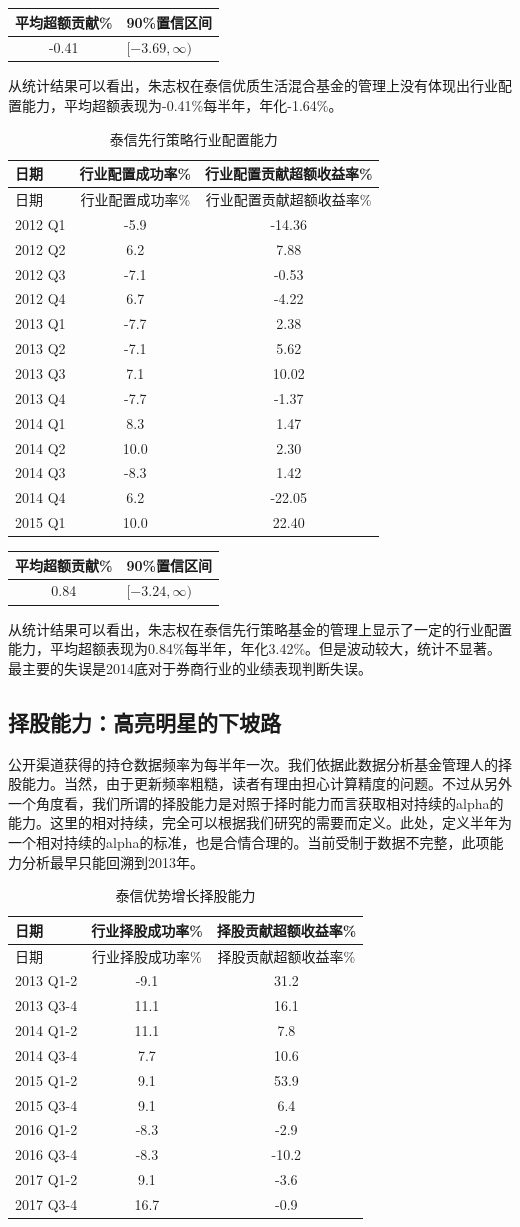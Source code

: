 \documentclass[hyperref,]{ctexart}
\begin{document}
\begin{longtable}[]{@{}cl@{}}
\toprule
平均超额贡献\% & 90\%置信区间\tabularnewline
\midrule
\endhead
-0.41 & \([-3.69,\infty)\)\tabularnewline
\bottomrule
\end{longtable}

从统计结果可以看出，朱志权在泰信优质生活混合基金的管理上没有体现出行业配置能力，平均超额表现为-0.41\%每半年，年化-1.64\%。

\begin{longtable}[]{@{}lcc@{}}
\caption{泰信先行策略行业配置能力}\tabularnewline
\toprule
日期 & 行业配置成功率\% & 行业配置贡献超额收益率\%\tabularnewline
\midrule
\endfirsthead
\toprule
日期 & 行业配置成功率\% & 行业配置贡献超额收益率\%\tabularnewline
\midrule
\endhead
2012 Q1 & -5.9 & -14.36\tabularnewline
2012 Q2 & 6.2 & 7.88\tabularnewline
2012 Q3 & -7.1 & -0.53\tabularnewline
2012 Q4 & 6.7 & -4.22\tabularnewline
2013 Q1 & -7.7 & 2.38\tabularnewline
2013 Q2 & -7.1 & 5.62\tabularnewline
2013 Q3 & 7.1 & 10.02\tabularnewline
2013 Q4 & -7.7 & -1.37\tabularnewline
2014 Q1 & 8.3 & 1.47\tabularnewline
2014 Q2 & 10.0 & 2.30\tabularnewline
2014 Q3 & -8.3 & 1.42\tabularnewline
2014 Q4 & 6.2 & -22.05\tabularnewline
2015 Q1 & 10.0 & 22.40\tabularnewline
\bottomrule
\end{longtable}

\begin{longtable}[]{@{}cl@{}}
\toprule
平均超额贡献\% & 90\%置信区间\tabularnewline
\midrule
\endhead
0.84 & \([-3.24,\infty)\)\tabularnewline
\bottomrule
\end{longtable}

从统计结果可以看出，朱志权在泰信先行策略基金的管理上显示了一定的行业配置能力，平均超额表现为0.84\%每半年，年化3.42\%。但是波动较大，统计不显著。最主要的失误是2014底对于券商行业的业绩表现判断失误。

\subsection{择股能力：高亮明星的下坡路}

公开渠道获得的持仓数据频率为每半年一次。我们依据此数据分析基金管理人的择股能力。当然，由于更新频率粗糙，读者有理由担心计算精度的问题。不过从另外一个角度看，我们所谓的择股能力是对照于择时能力而言获取相对持续的alpha的能力。这里的相对持续，完全可以根据我们研究的需要而定义。此处，定义半年为一个相对持续的alpha的标准，也是合情合理的。当前受制于数据不完整，此项能力分析最早只能回溯到2013年。

\begin{longtable}[]{@{}lcc@{}}
\caption{泰信优势增长择股能力}\tabularnewline
\toprule
日期 & 行业择股成功率\% & 择股贡献超额收益率\%\tabularnewline
\midrule
\endfirsthead
\toprule
日期 & 行业择股成功率\% & 择股贡献超额收益率\%\tabularnewline
\midrule
\endhead
2013 Q1-2 & -9.1 & 31.2\tabularnewline
2013 Q3-4 & 11.1 & 16.1\tabularnewline
2014 Q1-2 & 11.1 & 7.8\tabularnewline
2014 Q3-4 & 7.7 & 10.6\tabularnewline
2015 Q1-2 & 9.1 & 53.9\tabularnewline
2015 Q3-4 & 9.1 & 6.4\tabularnewline
2016 Q1-2 & -8.3 & -2.9\tabularnewline
2016 Q3-4 & -8.3 & -10.2\tabularnewline
2017 Q1-2 & 9.1 & -3.6\tabularnewline
2017 Q3-4 & 16.7 & -0.9\tabularnewline
\bottomrule
\end{longtable}
\end{document}
